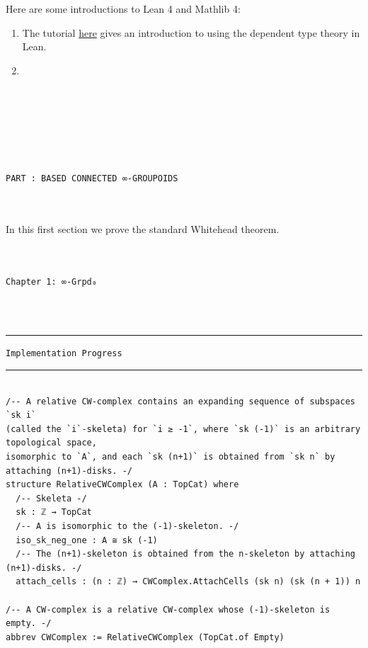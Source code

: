\documentclass{book}
\theoremstyle{definition}
\newcounter{pcounter}
\newcounter{lcounter}
\renewcommand{\chapter}[1]{
\newpage
{
\Huge 
\begin{center}
\ \\
\ \\
\thispagestyle{empty}
\texttt{#1}
\end{center}}
\ \\
\ \\
}
\newcounter{partcount}
\renewcommand{\part}[1]{
\newpage
{
\Huge 
\begin{center}
\ \\
\ \\
\ \\
\ \\
\ \\
\ \\
\thispagestyle{empty}
\texttt{PART {\thepartcount}: #1}
\stepcounter{partcount}
\end{center}}
\ \\
\ \\
}
\begin{document}
Here are some introductions to Lean 4 and Mathlib 4:

\begin{enumerate}
\item The tutorial \href{https://leanprover.github.io/theorem_proving_in_lean4/}{here} gives an introduction to using the dependent type theory in Lean.
\item 
\end{enumerate}


\part{BASED CONNECTED ∞-GROUPOIDS}

In this first section we prove the standard Whitehead theorem.\\


\chapter{Chapter 1: ∞\texttt{-Grpd₀}}


\noindent\textcolor{Red}{\rule{16cm}{1mm}}
\begin{center}
\texttt{Implementation Progress}
\end{center}
\noindent\textcolor{Red}{\rule{16cm}{1mm}}


\begin{center}
\begin{tcolorbox}[width=5in,colback={white},title={\begin{center}\texttt{Lean \thelcounter} \addtocounter{lcounter}{1}  \end{center}},colbacktitle=Blue,coltitle=black]
\begin{verbatim}

/-- A relative CW-complex contains an expanding sequence of subspaces `sk i`
(called the `i`-skeleta) for `i ≥ -1`, where `sk (-1)` is an arbitrary topological space,
isomorphic to `A`, and each `sk (n+1)` is obtained from `sk n` by attaching (n+1)-disks. -/
structure RelativeCWComplex (A : TopCat) where
  /-- Skeleta -/
  sk : ℤ → TopCat
  /-- A is isomorphic to the (-1)-skeleton. -/
  iso_sk_neg_one : A ≅ sk (-1)
  /-- The (n+1)-skeleton is obtained from the n-skeleton by attaching (n+1)-disks. -/
  attach_cells : (n : ℤ) → CWComplex.AttachCells (sk n) (sk (n + 1)) n

/-- A CW-complex is a relative CW-complex whose (-1)-skeleton is empty. -/
abbrev CWComplex := RelativeCWComplex (TopCat.of Empty)

\end{verbatim}
\end{tcolorbox}
\end{center}
\end{document}
